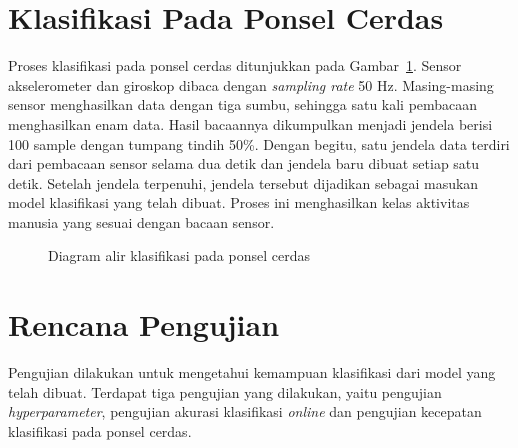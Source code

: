 \section{Klasifikasi Pada Ponsel Cerdas}
Proses klasifikasi pada ponsel cerdas ditunjukkan pada Gambar~\ref{gambar:diagram-alir-klasifikasi-ponsel-cerdas}. Sensor akselerometer dan giroskop dibaca dengan \textit{sampling rate} 50 Hz. Masing-masing sensor menghasilkan data dengan tiga sumbu, sehingga satu kali pembacaan menghasilkan enam data. Hasil bacaannya dikumpulkan menjadi jendela berisi 100 sample dengan tumpang tindih 50\%. Dengan begitu, satu jendela data terdiri dari pembacaan sensor selama dua detik dan jendela baru dibuat setiap satu detik. Setelah jendela terpenuhi, jendela tersebut dijadikan sebagai masukan model klasifikasi yang telah dibuat. Proses ini menghasilkan kelas aktivitas manusia yang sesuai dengan bacaan sensor.

\begin{figure}[h]
    \centering
    \caption{Diagram alir klasifikasi pada ponsel cerdas}
    \label{gambar:diagram-alir-klasifikasi-ponsel-cerdas}
\end{figure}

%
\section{Rencana Pengujian}
Pengujian dilakukan untuk mengetahui kemampuan klasifikasi dari model yang telah dibuat. Terdapat tiga pengujian yang dilakukan, yaitu pengujian \textit{hyperparameter}, pengujian akurasi klasifikasi \textit{online} dan pengujian kecepatan klasifikasi pada ponsel cerdas.

